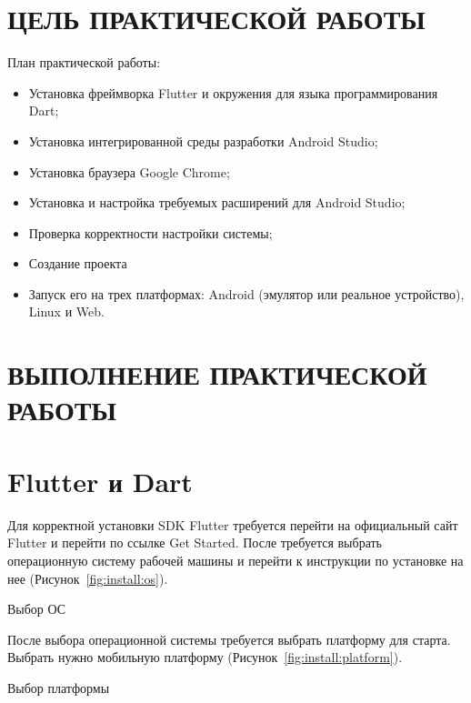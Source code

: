 \section*{ЦЕЛЬ ПРАКТИЧЕСКОЙ РАБОТЫ}

План практической работы:
\begin{itemize}
	\item Установка фреймворка Flutter
		и окружения для языка программирования Dart;
	\item Установка интегрированной среды разработки Android Studio;
	\item Установка браузера Google Chrome;
	\item Установка и настройка требуемых расширений для Android Studio;
	\item Проверка корректности настройки системы;
	\item Создание проекта
	\item Запуск его на трех платформах:
		Android (эмулятор или реальное устройство), Linux и Web.
\end{itemize}

\clearpage

\section*{ВЫПОЛНЕНИЕ ПРАКТИЧЕСКОЙ РАБОТЫ}
\section{Flutter и Dart}

Для корректной установки SDK Flutter требуется перейти
на официальный сайт Flutter и перейти по ссылке Get Started.
После требуется выбрать операционную систему рабочей машины
и перейти к инструкции по установке на нее (Рисунок~\ref{fig:install:os}).

\begin{image}
	\caption{Выбор ОС}
	\label{fig:install:os}
\end{image}

После выбора операционной системы требуется выбрать платформу для старта.
Выбрать нужно мобильную платформу (Рисунок~\ref{fig:install:platform}).

\begin{image}
	\caption{Выбор платформы}
	\label{fig:install:platform}
\end{image}

